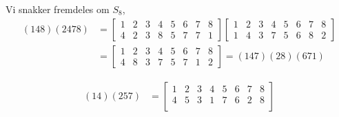 \documentclass[a4paper,norsk,12pt]{article}
\begin{document}
Vi snakker fremdeles om $S_8$,
\begin{align*}
  (148)(2478) &=
  \left[\begin{matrix}
      1 & 2 & 3 & 4 & 5 & 6 & 7 & 8 \\
      4 & 2 & 3 & 8 & 5 & 7 & 7 & 1
  \end{matrix}\right] 
  \left[\begin{matrix}
      1 & 2 & 3 & 4 & 5 & 6 & 7 & 8 \\
      1 & 4 & 3 & 7 & 5 & 6 & 8 & 2
  \end{matrix}\right] \\
  &=
  \left[\begin{matrix}
      1 & 2 & 3 & 4 & 5 & 6 & 7 & 8 \\
      4 & 8 & 3 & 7 & 5 & 7 & 1 & 2
  \end{matrix}\right] 
  = (147)(28)(671)
\end{align*}

\begin{align*}
  (14)(257) &=
  \left[\begin{matrix}
      1 & 2 & 3 & 4 & 5 & 6 & 7 & 8 \\
      4 & 5 & 3 & 1 & 7 & 6 & 2 & 8 \\
  \end{matrix}\right]
\end{align*}

\end{document}
